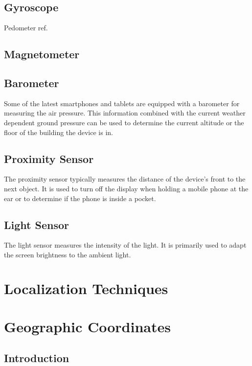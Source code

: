 \subsection*{Gyroscope}

Pedometer ref.

\subsection*{Magnetometer}

\subsection*{Barometer}

Some of the latest smartphones and tablets are equipped with a barometer for measuring the air pressure. This information combined with the current weather dependent ground pressure can be used to determine the current altitude or the floor of the building the device is in. 

\subsection*{Proximity Sensor}

The proximity sensor typically measures the distance of the device's front to the next object. It is used to turn off the display when holding a mobile phone at the ear or to determine if the phone is inside a pocket.

\subsection*{Light Sensor}

The light sensor measures the intensity of the light. It is primarily used to adapt the screen brightness to the ambient light.

\section{Localization Techniques}


\section{Geographic Coordinates}

\subsection{Introduction}

